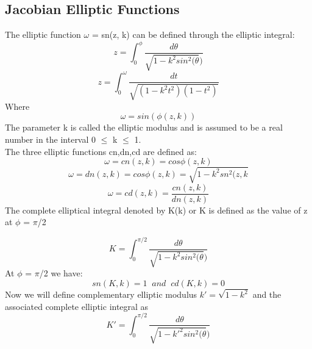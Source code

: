 \documentclass[12pt]{article}
\begin{document}
\subsection{\textbf{Jacobian Elliptic Functions}}
The elliptic function $\omega$ = sn(z, k) can be defined through the elliptic integral:
\begin{equation*}
    z =  \int_{0}^{\phi} \frac{d\theta}{\sqrt{1-k^2sin^2(\theta})}
   
\end{equation*}
\begin{equation*}
     z =\int_{0}^{\omega} \frac{dt}{\sqrt{(1-k^2t^2)(1-t^2)}}
\end{equation*}
Where 
\begin{equation*}
    \omega = sin(\phi(z,k))
\end{equation*}
The parameter k is called the elliptic modulus and is assumed to be a real number
in the interval 0 $\leq$ k $\leq$ 1.\\
The three elliptic functions cn,dn,cd are defined as:
\begin{equation*}
    \omega = cn(z,k)= cos\phi(z,k)
\end{equation*}
\begin{equation*}
    \omega = dn(z,k)= cos\phi(z,k) = \sqrt{1-k^2sn^2(z,k}
\end{equation*}
\begin{equation*}
    \omega = cd(z,k)= \frac{cn(z,k)}{dn(z,k)}
\end{equation*}
The complete elliptical integral denoted by K(k) or K is defined as the value of z at $\phi$ = $\pi$/2


\begin{equation*}
    K =  \int_{0}^{\pi/2} \frac{d\theta}{\sqrt{1-k^2sin^2(\theta})}
\end{equation*}
At $\phi$ = $\pi$/2 we have:
\begin{equation*}
    sn(K,k) = 1 \;\;and\;\; cd(K,k) =0
\end{equation*}
Now we will define complementary elliptic modulus $k' = \sqrt{1-k^2}$ and the associated complete elliptic integral as
\begin{equation*}
    K' =  \int_{0}^{\pi/2} \frac{d\theta}{\sqrt{1-k'^2sin^2(\theta})}
\end{equation*}
\end{document}
